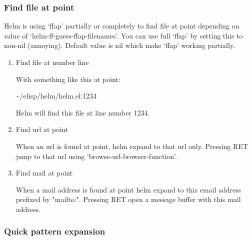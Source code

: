 \documentclass[11pt]{article}
\begin{document}
\subsubsection{Find file at point}
\label{sec:org478d107}

Helm is using ‘ffap’ partially or completely to find file at point
depending on value of ‘helm-ff-guess-ffap-filenames’.
You can use full ‘ffap’ by setting this to non-nil (annoying).
Default value is nil which make ‘ffap’ working partially.

\begin{enumerate}
\item Find file at number line
\label{sec:org72c53e6}

With something like this at point:

\textasciitilde{}/elisp/helm/helm.el:1234

Helm will find this file at line number 1234.

\item Find url at point
\label{sec:org9720330}

When an url is found at point, helm expand to that url only.
Pressing RET jump to that url using ‘browse-url-browser-function’.

\item Find mail at point
\label{sec:org03f8b42}

When a mail address is found at point helm expand to this email address
prefixed by "mailto:". Pressing RET open a message buffer with this mail
address.
\end{enumerate}

\subsubsection{Quick pattern expansion}
\label{sec:org1ba65d2}
\end{document}
